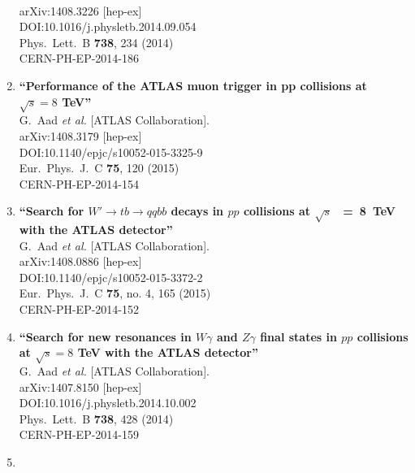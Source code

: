 \documentclass{article}
\begin{document}
\begin{enumerate}
  \\{}arXiv:1408.3226 [hep-ex]
  \\{}DOI:10.1016/j.physletb.2014.09.054
  \\{}Phys.\ Lett.\ B {\bf 738}, 234 (2014)
  \\{}CERN-PH-EP-2014-186
\item%
{\bf ``Performance of the ATLAS muon trigger in pp collisions at $\sqrt{s}=8$ TeV''}
  \\{}G.~Aad {\it et al.} [ATLAS Collaboration].
  \\{}arXiv:1408.3179 [hep-ex]
  \\{}DOI:10.1140/epjc/s10052-015-3325-9
  \\{}Eur.\ Phys.\ J.\ C {\bf 75}, 120 (2015)
  \\{}CERN-PH-EP-2014-154
\item%
{\bf ``Search for $W' \rightarrow tb \rightarrow qqbb$ decays in $pp$ collisions at $\sqrt{s}$  = 8 TeV with the ATLAS detector''}
  \\{}G.~Aad {\it et al.} [ATLAS Collaboration].
  \\{}arXiv:1408.0886 [hep-ex]
  \\{}DOI:10.1140/epjc/s10052-015-3372-2
  \\{}Eur.\ Phys.\ J.\ C {\bf 75}, no. 4, 165 (2015)
  \\{}CERN-PH-EP-2014-152
\item%
{\bf ``Search for new resonances in $W\gamma$ and $Z\gamma$ final states in $pp$ collisions at $\sqrt s=8$ TeV with the ATLAS detector''}
  \\{}G.~Aad {\it et al.} [ATLAS Collaboration].
  \\{}arXiv:1407.8150 [hep-ex]
  \\{}DOI:10.1016/j.physletb.2014.10.002
  \\{}Phys.\ Lett.\ B {\bf 738}, 428 (2014)
  \\{}CERN-PH-EP-2014-159
\item%

\end{enumerate}
\end{document}
